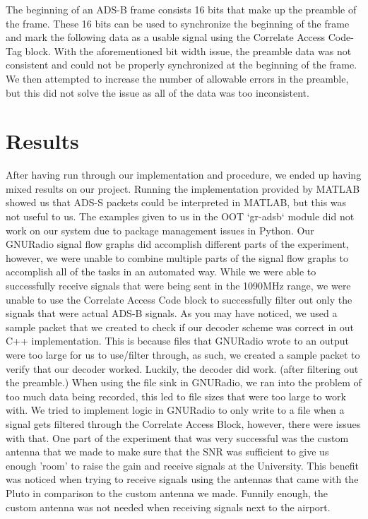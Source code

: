 \documentclass[conference, onecolumn]{IEEEtran}
\begin{document}
The beginning of an ADS-B frame consists 16 bits that make up the preamble of the frame. These 16 bits can be used to synchronize the beginning of the frame and mark the following data as a usable signal using the Correlate Access Code-Tag block. With the aforementioned bit width issue, the preamble data was not consistent and could not be properly synchronized at the beginning of the frame. We then attempted to increase the number of allowable errors in the preamble, but this did not solve the issue as all of the data was too inconsistent.

\section{Results}
After having run through our implementation and procedure, we ended up having mixed results on our project. Running the implementation provided by MATLAB showed us that ADS-S packets could be interpreted in MATLAB, but this was not useful to us. The examples given to us in the OOT `gr-adsb` module did not work on our system due to package management issues in Python. Our GNURadio signal flow graphs did accomplish different parts of the experiment, however, we were unable to combine multiple parts of the signal flow graphs to accomplish all of the tasks in an automated way. While we were able to successfully receive signals that were being sent in the 1090MHz range, we were unable to use the Correlate Access Code block to successfully filter out only the signals that were actual ADS-B signals. As you may have noticed, we used a sample packet that we created to check if our decoder scheme was correct in out C++ implementation. This is because files that GNURadio wrote to an output were too large for us to use/filter through, as such, we created a sample packet to verify that our decoder worked. Luckily, the decoder did work. (after filtering out the preamble.) When using the file sink in GNURadio, we ran into the problem of too much data being recorded, this led to file sizes that were too large to work with. We tried to implement logic in GNURadio to only write to a file when a signal gets filtered through the Correlate Access Block, however, there were issues with that. One part of the experiment that was very successful was the custom antenna that we made to make sure that the SNR was sufficient to give us enough 'room' to raise the gain and receive signals at the University. This benefit was noticed when trying to receive signals using the antennas that came with the Pluto in comparison to the custom antenna we made. Funnily enough, the custom antenna was not needed when receiving signals next to the airport.
\end{document}
